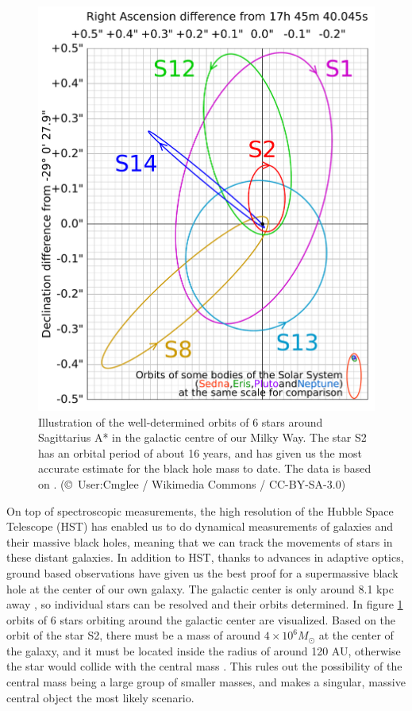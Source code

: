 \documentclass[english, oneside]{HYgradu}
\begin{document}
\begin{figure}[h!tb]
\centering
\includegraphics[width=\textwidth]{../images/MilkyWaySMBH.pdf}
\caption{Illustration of the well-determined orbits of 6 stars around Sagittarius A* in the galactic centre of our Milky Way. The star S2 has an orbital period of about 16 years, and has given us the most accurate estimate for the black hole mass to date. The data is based on \cite{eisenhauer:2005}.
(\copyright \ User:Cmglee / Wikimedia Commons / CC-BY-SA-3.0)}
\label{fig:MilkyWayBH}
\end{figure}

On top of spectroscopic measurements, the high resolution of the Hubble Space Telescope (HST) has enabled us to do dynamical measurements of galaxies and their massive black holes, meaning that we can track the movements of stars in these distant galaxies. In addition to HST, thanks to advances in adaptive optics, ground based observations have given us the best proof for a supermassive black hole at the center of our own galaxy. The galactic center is only around 8.1 kpc away \citep{eisenhauer:2018}, so individual stars can be resolved and their orbits determined. In figure \ref{fig:MilkyWayBH} orbits of 6 stars orbiting around the galactic center are visualized. Based on the orbit of the star S2, there must be a mass of around $4 \times 10^6 M_\odot$ at the center of the galaxy, and it must be located inside the radius of around 120 AU, otherwise the star would collide with the central mass \citep{kormendy:2013}. This rules out the possibility of the central mass being a large group of smaller masses, and makes a singular, massive central object the most likely scenario.
\end{document}
